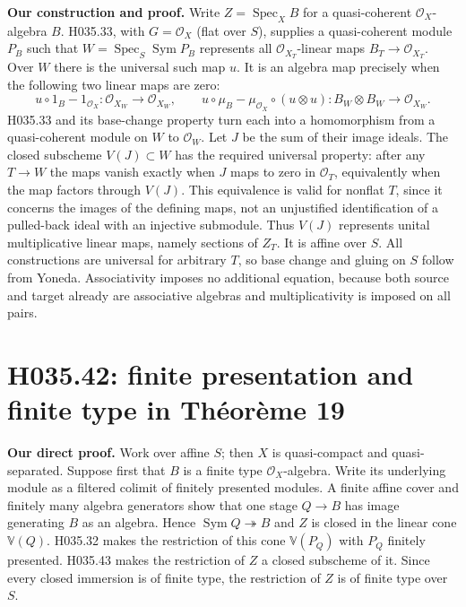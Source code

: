 \textbf{Our construction and proof.} Write $Z=\operatorname{Spec}_X B$
for a quasi-coherent $\mathcal O_X$-algebra $B$. H035.33, with
$G=\mathcal O_X$ (flat over $S$), supplies a quasi-coherent module
$P_B$ such that $W=\operatorname{Spec}_S\operatorname{Sym}P_B$
represents all $\mathcal O_{X_T}$-linear maps $B_T\to\mathcal O_{X_T}$.
Over $W$ there is the universal such map $u$. It is an algebra map
precisely when the following two linear maps are zero:
\[
 u\circ 1_B-1_{\mathcal O_X}:\mathcal O_{X_W}\to\mathcal O_{X_W},
 \qquad
 u\circ\mu_B-\mu_{\mathcal O_X}\circ(u\otimes u):
 B_W\otimes B_W\to\mathcal O_{X_W}.
\]
H035.33 and its base-change property turn each into a homomorphism
from a quasi-coherent module on $W$ to $\mathcal O_W$. Let $J$
be the sum of their image ideals. The closed subscheme $V(J)\subset W$
has the required universal property: after any $T\to W$ the maps
vanish exactly when $J$ maps to zero in $\mathcal O_T$, equivalently
when the map factors through $V(J)$. This equivalence is valid for
nonflat $T$, since it concerns the images of the defining maps,
not an unjustified identification of a pulled-back ideal with an
injective submodule. Thus $V(J)$ represents unital multiplicative
linear maps, namely sections of $Z_T$. It is affine over $S$.
All constructions are universal for arbitrary $T$, so base change
and gluing on $S$ follow from Yoneda. Associativity imposes no
additional equation, because both source and target already are
associative algebras and multiplicativity is imposed on all pairs.

\section{H035.42: finite presentation and finite type in Théorème 19}
\textbf{Our direct proof.} Work over affine $S$; then $X$ is
quasi-compact and quasi-separated. Suppose first that $B$ is a
finite type $\mathcal O_X$-algebra. Write its underlying module
as a filtered colimit of finitely presented modules. A finite
affine cover and finitely many algebra generators show that one
stage $Q\to B$ has image generating $B$ as an algebra. Hence
$\operatorname{Sym}Q\twoheadrightarrow B$ and $Z$ is closed
in the linear cone $\mathbb V(Q)$. H035.32 makes the restriction
of this cone $\mathbb V(P_Q)$ with $P_Q$ finitely presented.
H035.43 makes the restriction of $Z$ a closed subscheme of it.
Since every closed immersion is of finite type, the restriction
of $Z$ is of finite type over $S$.

